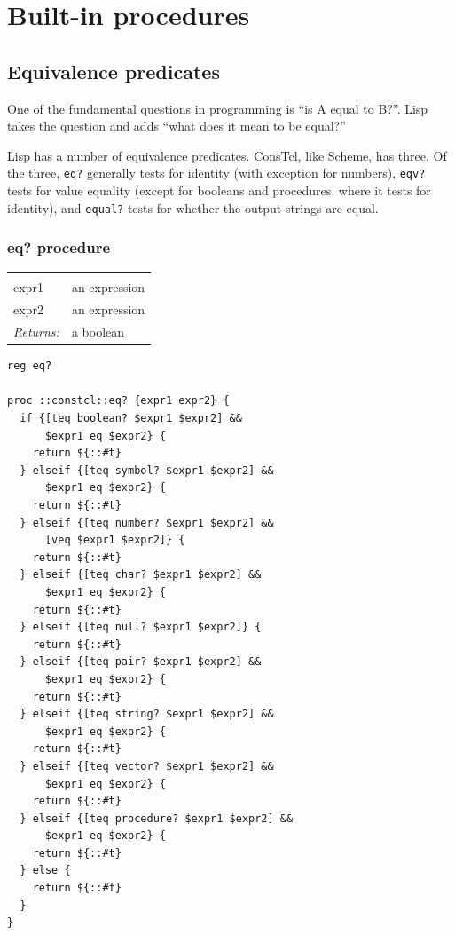 \documentclass[twoside]{report}
\begin{document}
\chapter{Built-in procedures}
\label{builtin-procedures}

\section{Equivalence predicates}
\label{equivalence-predicates}

One of the fundamental questions in programming is ``is A equal to B?''. Lisp takes the question and adds ``what does it mean to be equal?''

Lisp has a number of equivalence predicates. ConsTcl, like Scheme, has three. Of the three, \texttt{eq?} generally tests for identity (with exception for numbers), \texttt{eqv?} tests for value equality (except for booleans and procedures, where it tests for identity), and \texttt{equal?} tests for whether the output strings are equal.

\subsection{eq? procedure}
\label{eq-procedure}

\noindent\begin{tabular}{ |p{1.9cm} p{8cm}| }
\hline
\rowcolor[HTML]{CCCCCC} \multicolumn{2}{|l|}{\bf eq?, eqv?, equal? (public)} \\
expr1 & an expression \\
expr2 & an expression \\
\textit{Returns:} & a boolean \\
\hline
\end{tabular}

\begin{lstlisting}
reg eq?

proc ::constcl::eq? {expr1 expr2} {
  if {[teq boolean? $expr1 $expr2] &&
      $expr1 eq $expr2} {
    return ${::#t}
  } elseif {[teq symbol? $expr1 $expr2] &&
      $expr1 eq $expr2} {
    return ${::#t}
  } elseif {[teq number? $expr1 $expr2] &&
      [veq $expr1 $expr2]} {
    return ${::#t}
  } elseif {[teq char? $expr1 $expr2] &&
      $expr1 eq $expr2} {
    return ${::#t}
  } elseif {[teq null? $expr1 $expr2]} {
    return ${::#t}
  } elseif {[teq pair? $expr1 $expr2] &&
      $expr1 eq $expr2} {
    return ${::#t}
  } elseif {[teq string? $expr1 $expr2] &&
      $expr1 eq $expr2} {
    return ${::#t}
  } elseif {[teq vector? $expr1 $expr2] &&
      $expr1 eq $expr2} {
    return ${::#t}
  } elseif {[teq procedure? $expr1 $expr2] &&
      $expr1 eq $expr2} {
    return ${::#t}
  } else {
    return ${::#f}
  }
}
\end{lstlisting}
\end{document}
